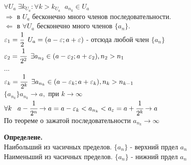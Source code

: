 \documentclass[12pt, a4paper]{article}
\newcommand{\eps}{\varepsilon}
\begin{document}
\begin{centering}
\begin{tcolorbox}[]
    $\forall U_a \; \exists k_{U_a}: \forall k > k_{U_a} \;\; a_{n_k} \in U_a$\\
    $\Rightarrow$ в $U_a$ бесконечно много членов последовательности.\\
    $\Leftarrow$ в $\forall U_a$ бесконечно много членов $\{a_n\}$.\\
    $\eps_1 = \cfrac{1}{2} \;\; U_a = (a-\eps; a+\eps)$ - отсюда любой член $\{a_n\}$\\
    $\eps_2 = \cfrac{1}{2^2} \;\; \exists a_{n_2} \in (a-\eps_2; a+\eps_2), n_2>n_1$\\
    ...\\
    $\eps_k = \cfrac{1}{2^k} \;\; \exists a_{n_k} \in (a-\eps_k; a+\eps_k), n_k>n_{k-1}$\\
    $\{a_{n_k}\} a_{n_k} \to a,$ при $k\to \infty$\\
    $\forall k\;\;\; a-\cfrac{1}{2^n} \to a= a - \eps_k < a_{n_k} < a_\eps = a+ \cfrac{1}{2^k} \to a$\\
    По теореме о зажатой последовательности $a_{n_k} \to \infty$
\end{tcolorbox}

\begin{tcolorbox}
    \textbf{Определене.} \\
    Наибольший из часичных пределов. $\{a_n\}$ - верхний прдел $a_n$\\
    Наименьший из часичных пределов. $\{a_n\}$ - нижний прдел $a_n$
\end{tcolorbox}


\end{centering}
\end{document}
